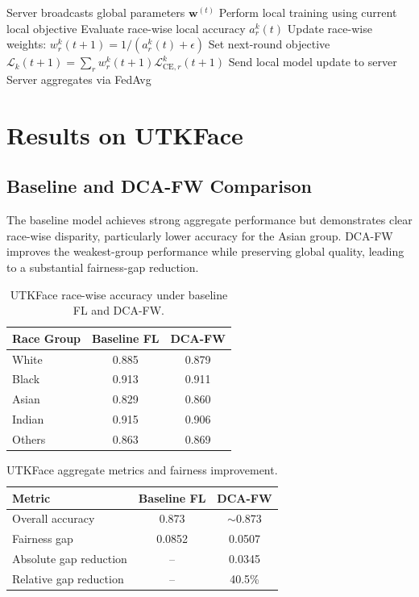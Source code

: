 \documentclass[11pt,a4paper]{article}
\begin{document}
\begin{algorithm}[H]
\caption{Dynamic Client-Adaptive Fairness Weighting (DCA-FW)}
\begin{algorithmic}[1]
    \State Server broadcasts global parameters $\mathbf{w}^{(t)}$
        \State Perform local training using current local objective
            \State Evaluate race-wise local accuracy $a_r^k(t)$
            \State Update race-wise weights: $w_r^k(t+1)=1/(a_r^k(t)+\epsilon)$
            \State Set next-round objective $\mathcal{L}_k(t+1)=\sum_r w_r^k(t+1)\mathcal{L}_{\mathrm{CE},r}^k(t+1)$
        \EndIf
        \State Send local model update to server
    \EndFor
    \State Server aggregates via FedAvg
\EndFor
\end{algorithmic}
\end{algorithm}

\section{Results on UTKFace}
\subsection{Baseline and DCA-FW Comparison}
The baseline model achieves strong aggregate performance but demonstrates clear race-wise disparity, particularly lower accuracy for the Asian group. DCA-FW improves the weakest-group performance while preserving global quality, leading to a substantial fairness-gap reduction.

\begin{table}[H]
\centering
\small
\begin{tabular}{lcc}
\toprule
\textbf{Race Group} & \textbf{Baseline FL} & \textbf{DCA-FW} \\
\midrule
White  & 0.885 & 0.879 \\
Black  & 0.913 & 0.911 \\
Asian  & 0.829 & 0.860 \\
Indian & 0.915 & 0.906 \\
Others & 0.863 & 0.869 \\
\bottomrule
\end{tabular}
\caption{UTKFace race-wise accuracy under baseline FL and DCA-FW.}
\end{table}

\begin{table}[H]
\centering
\small
\begin{tabular}{lcc}
\toprule
\textbf{Metric} & \textbf{Baseline FL} & \textbf{DCA-FW} \\
\midrule
Overall accuracy & 0.873 & $\sim$0.873 \\
Fairness gap & 0.0852 & 0.0507 \\
Absolute gap reduction & -- & 0.0345 \\
Relative gap reduction & -- & 40.5\% \\
\bottomrule
\end{tabular}
\caption{UTKFace aggregate metrics and fairness improvement.}
\end{table}
\end{document}
